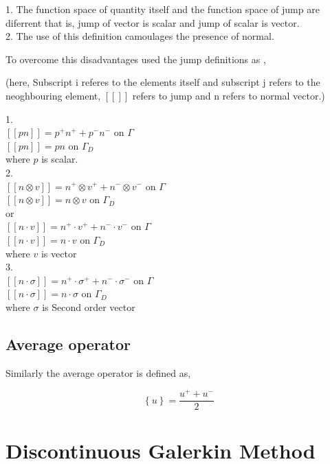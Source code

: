 \documentclass[a4paper,12pt]{book}
\begin{document}
1. The function space of quantity itself and the function space of jump are diferrent that is, jump of vector is scalar and jump of scalar is vector.\\
2. The use of this definition camoulages the presence of normal.

To overcome this disadvantages \citep{Montlaur2} used the jump definitions as ,

(here, Subscript i referes to the elements itself and subscript j refers to the neoghbouring element, $[[ ]]$ refers to jump and n refers to normal vector.)

1. \\
$[[pn]] = p^+ n^+ + p^- n^- $ on $\Gamma$\\
$[[pn]] = p n $ on $\Gamma_D$\\
where $p$ is scalar. \\

2. \\
$[[n \otimes v]] = n^+ \otimes v^+ + n^- \otimes v^-$ on $\Gamma$\\
$[[n \otimes v]] = n \otimes v$ on $\Gamma_D$\\
 or \\
$[[n \cdot v]] = n^+ \cdot v^+ + n^- \cdot v^-$ on $\Gamma$\\
$[[n \cdot v]] = n \cdot v$ on $\Gamma_D$\\
where $v$ is vector\\

3. \\
$[[n \cdot \sigma]] = n^+ \cdot \sigma^+ + n^- \cdot \sigma^-$ on $\Gamma$\\
$[[n \cdot \sigma]] = n \cdot \sigma$ on $\Gamma_D$\\
where $\sigma$ is Second order vector

\subsection{Average operator}

Similarly the average operator is defined as,

\begin{equation}\label{average operator}
\left\lbrace u \right\rbrace = \frac{u^+ + u^-}{2}  
\end{equation} 

\section{Discontinuous Galerkin Method}
\end{document}
